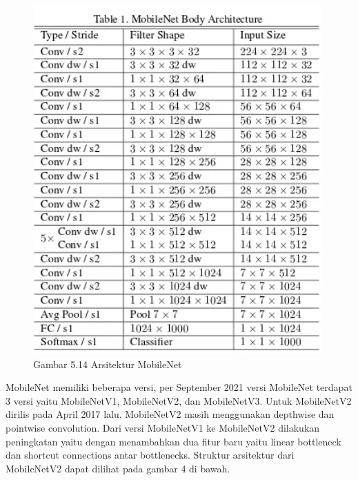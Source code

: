 \documentclass[
  letterpaper,
  DIV=11,
  numbers=noendperiod]{scrreprt}
\begin{document}
\begin{figure}

{\centering \includegraphics{Asset/mobilenet3.png}

}

\caption{Gambar 5.14 Arsitektur MobileNet}

\end{figure}

MobileNet memiliki beberapa versi, per September 2021 versi MobileNet
terdapat 3 versi yaitu MobileNetV1, MobileNetV2, dan MobileNetV3. Untuk
MobileNetV2 dirilis pada April 2017 lalu. MobileNetV2 masih menggunakan
depthwise dan pointwise convolution. Dari versi MobileNetV1 ke
MobileNetV2 dilakukan peningkatan yaitu dengan menambahkan dua fitur
baru yaitu linear bottleneck dan shortcut connections antar bottlenecks.
Struktur arsitektur dari MobileNetV2 dapat dilihat pada gambar 4 di
bawah.
\end{document}
